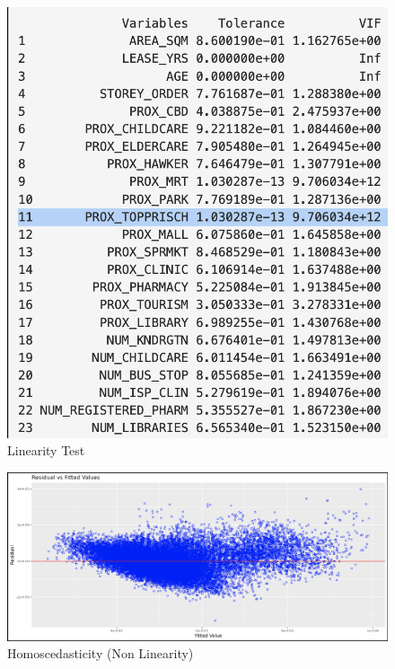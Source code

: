 \documentclass[manuscript,screen]{acmart}
\begin{document}
\begin{figure}

{\centering \includegraphics{images/Screenshot 2023-04-15 at 11.02.35 PM.png}

}

\caption{\label{fig-10}Linearity Test}

\end{figure}

\begin{figure}

{\centering \includegraphics{images/Screenshot 2023-04-15 at 11.02.44 PM.png}

}

\caption{\label{fig-11}Homoscedasticity (Non Linearity)}

\end{figure}
\end{document}
